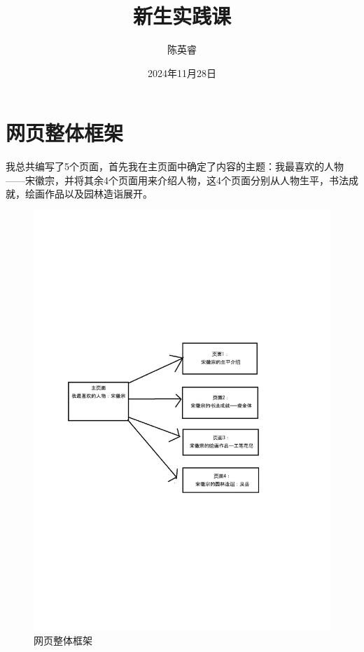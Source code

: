 \documentclass[supercite]{Experimental_Report}
\title{~~~~~~新生实践课~~~~~~}
\author{陈英睿}
\date{2024年11月28日}
\theoremstyle{definition}
\begin{document}
\maketitle

\clearpage


\tableofcontents[level=2]
\clearpage


\section{网页整体框架}
我总共编写了5个页面，首先我在主页面中确定了内容的主题：我最喜欢的人物——宋徽宗，并将其余4个页面用来介绍人物，这4个页面分别从人物生平，书法成就，绘画作品以及园林造诣展开。
\begin{figure}[H]
  \centering
  \includegraphics[width=0.75\linewidth]{./images/页面框架.pdf}
  \caption{网页整体框架}
  \label{fig:enter-label}
\end{figure}

\newpage
\end{document}
